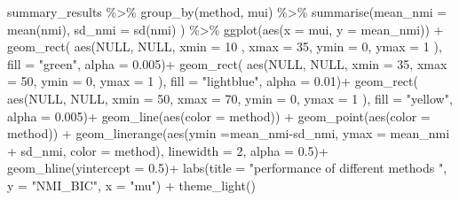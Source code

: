 \documentclass[
]{article}
\newenvironment{Shaded}{\begin{snugshade}}{\end{snugshade}}
\newcommand{\AttributeTok}[1]{\textcolor[rgb]{0.77,0.63,0.00}{#1}}
\newcommand{\ConstantTok}[1]{\textcolor[rgb]{0.00,0.00,0.00}{#1}}
\newcommand{\DecValTok}[1]{\textcolor[rgb]{0.00,0.00,0.81}{#1}}
\newcommand{\FloatTok}[1]{\textcolor[rgb]{0.00,0.00,0.81}{#1}}
\newcommand{\FunctionTok}[1]{\textcolor[rgb]{0.00,0.00,0.00}{#1}}
\newcommand{\NormalTok}[1]{#1}
\newcommand{\SpecialCharTok}[1]{\textcolor[rgb]{0.00,0.00,0.00}{#1}}
\newcommand{\StringTok}[1]{\textcolor[rgb]{0.31,0.60,0.02}{#1}}
\begin{document}
\begin{Shaded}
\begin{Highlighting}[]
\NormalTok{summary\_results }\SpecialCharTok{\%\textgreater{}\%} \FunctionTok{group\_by}\NormalTok{(method, mui) }\SpecialCharTok{\%\textgreater{}\%} 
    \FunctionTok{summarise}\NormalTok{(}\AttributeTok{mean\_nmi =} \FunctionTok{mean}\NormalTok{(nmi), }\AttributeTok{sd\_nmi =} \FunctionTok{sd}\NormalTok{(nmi) ) }\SpecialCharTok{\%\textgreater{}\%}
    \FunctionTok{ggplot}\NormalTok{(}\FunctionTok{aes}\NormalTok{(}\AttributeTok{x =}\NormalTok{ mui, }\AttributeTok{y =}\NormalTok{ mean\_nmi)) }\SpecialCharTok{+}
    \FunctionTok{geom\_rect}\NormalTok{( }\FunctionTok{aes}\NormalTok{(}\ConstantTok{NULL}\NormalTok{, }\ConstantTok{NULL}\NormalTok{, }\AttributeTok{xmin =} \DecValTok{10}\NormalTok{ , }\AttributeTok{xmax =} \DecValTok{35}\NormalTok{, }\AttributeTok{ymin =} \DecValTok{0}\NormalTok{, }\AttributeTok{ymax =} \DecValTok{1}\NormalTok{ ), }\AttributeTok{fill =} \StringTok{"green"}\NormalTok{, }\AttributeTok{alpha =} \FloatTok{0.005}\NormalTok{)}\SpecialCharTok{+}
    \FunctionTok{geom\_rect}\NormalTok{( }\FunctionTok{aes}\NormalTok{(}\ConstantTok{NULL}\NormalTok{, }\ConstantTok{NULL}\NormalTok{, }\AttributeTok{xmin =} \DecValTok{35}\NormalTok{, }\AttributeTok{xmax =} \DecValTok{50}\NormalTok{, }\AttributeTok{ymin =} \DecValTok{0}\NormalTok{, }\AttributeTok{ymax =} \DecValTok{1}\NormalTok{ ), }\AttributeTok{fill =} \StringTok{"lightblue"}\NormalTok{, }\AttributeTok{alpha =} \FloatTok{0.01}\NormalTok{)}\SpecialCharTok{+}
    \FunctionTok{geom\_rect}\NormalTok{( }\FunctionTok{aes}\NormalTok{(}\ConstantTok{NULL}\NormalTok{, }\ConstantTok{NULL}\NormalTok{, }\AttributeTok{xmin =} \DecValTok{50}\NormalTok{, }\AttributeTok{xmax =} \DecValTok{70}\NormalTok{, }\AttributeTok{ymin =} \DecValTok{0}\NormalTok{, }\AttributeTok{ymax =} \DecValTok{1}\NormalTok{ ), }\AttributeTok{fill =} \StringTok{"yellow"}\NormalTok{, }\AttributeTok{alpha =} \FloatTok{0.005}\NormalTok{)}\SpecialCharTok{+}
    \FunctionTok{geom\_line}\NormalTok{(}\FunctionTok{aes}\NormalTok{(}\AttributeTok{color =}\NormalTok{ method)) }\SpecialCharTok{+}
    \FunctionTok{geom\_point}\NormalTok{(}\FunctionTok{aes}\NormalTok{(}\AttributeTok{color =}\NormalTok{ method)) }\SpecialCharTok{+}
    \FunctionTok{geom\_linerange}\NormalTok{(}\FunctionTok{aes}\NormalTok{(}\AttributeTok{ymin =}\NormalTok{mean\_nmi}\SpecialCharTok{{-}}\NormalTok{sd\_nmi, }\AttributeTok{ymax =}\NormalTok{ mean\_nmi }\SpecialCharTok{+}\NormalTok{ sd\_nmi, }\AttributeTok{color =}\NormalTok{ method), }\AttributeTok{linewidth =} \DecValTok{2}\NormalTok{, }\AttributeTok{alpha =} \FloatTok{0.5}\NormalTok{)}\SpecialCharTok{+}
    \FunctionTok{geom\_hline}\NormalTok{(}\AttributeTok{yintercept =} \FloatTok{0.5}\NormalTok{)}\SpecialCharTok{+}
    \FunctionTok{labs}\NormalTok{(}\AttributeTok{title =} \StringTok{"performance of different methods "}\NormalTok{, }\AttributeTok{y =} \StringTok{"NMI\_BIC"}\NormalTok{, }\AttributeTok{x =} \StringTok{"mu"}\NormalTok{) }\SpecialCharTok{+}
    \FunctionTok{theme\_light}\NormalTok{()  }
\end{Highlighting}
\end{Shaded}
\end{document}
